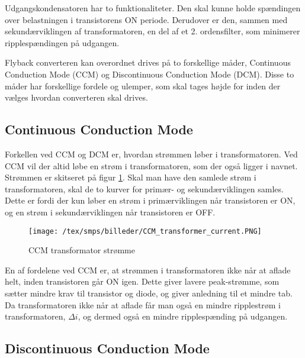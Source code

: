 Udgangskondensatoren har to funktionaliteter. Den skal kunne holde spændingen over belastningen i transistorens ON periode. Derudover er den, sammen med sekundærviklingen af transformatoren, en del af et 2. ordensfilter, som minimerer ripplespændingen på udgangen.

Flyback converteren kan overordnet drives på to forskellige måder, Continuous Conduction Mode (CCM) og Discontinuous Conduction Mode (DCM). Disse to måder har forskellige fordele og ulemper, som skal tages højde for inden der vælges hvordan converteren skal drives. 

\subsection{Continuous Conduction Mode}
Forkellen ved CCM og DCM er, hvordan strømmen løber i transformatoren. Ved CCM vil der altid løbe en strøm i transformatoren, som der også ligger i navnet. Strømmen er skitseret på figur \ref{fig:CCM_transformer_current}. Skal man have den samlede strøm i transformatoren, skal de to kurver for primær- og sekundærviklingen samles. Dette er fordi der kun løber en strøm i primærviklingen når transistoren er ON, og en strøm i sekundærviklingen når transistoren er OFF. 

\begin{figure}[H]
	\center
	\texttt{[image: /tex/smps/billeder/CCM\_transformer\_current.PNG]}
	\caption{CCM transformator strømme}
	\label{fig:CCM_transformer_current}
\end{figure}

\noindent En af fordelene ved CCM er, at strømmen i transformatoren ikke når at aflade helt, inden transistoren går ON igen. Dette giver lavere peak-strømme, som sætter mindre krav til transistor og diode, og giver anledning til et mindre tab. Da transformatoren ikke når at aflade får man også en mindre ripplestrøm i transformatoren, $\Delta i$, og dermed også en mindre ripplespænding på udgangen. 

\subsection{Discontinuous Conduction Mode}

